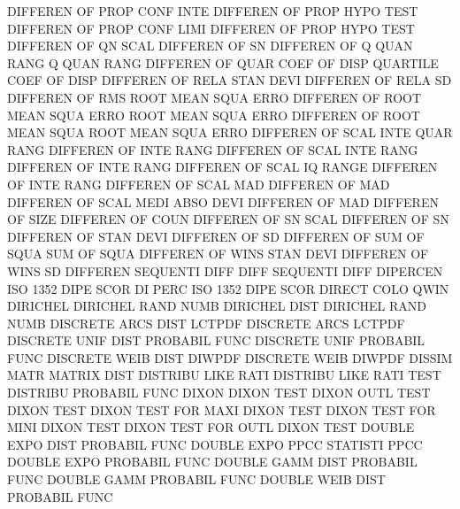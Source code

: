 DIFFEREN OF   PROP CONF INTE            DIFFEREN OF   PROP HYPO TEST
DIFFEREN OF   PROP CONF LIMI            DIFFEREN OF   PROP HYPO TEST
DIFFEREN OF   QN   SCAL                 DIFFEREN OF   SN
DIFFEREN OF   Q    QUAN RANG            Q        QUAN RANG
DIFFEREN OF   QUAR COEF OF   DISP       QUARTILE COEF OF   DISP
DIFFEREN OF   RELA STAN DEVI            DIFFEREN OF   RELA SD
DIFFEREN OF   RMS                       ROOT     MEAN SQUA ERRO
DIFFEREN OF   ROOT MEAN SQUA ERRO       ROOT     MEAN SQUA ERRO
DIFFEREN OF   ROOT MEAN SQUA            ROOT     MEAN SQUA ERRO
DIFFEREN OF   SCAL INTE QUAR RANG       DIFFEREN OF   INTE RANG
DIFFEREN OF   SCAL INTE RANG            DIFFEREN OF   INTE RANG
DIFFEREN OF   SCAL IQ   RANGE           DIFFEREN OF   INTE RANG
DIFFEREN OF   SCAL MAD                  DIFFEREN OF   MAD
DIFFEREN OF   SCAL MEDI ABSO DEVI       DIFFEREN OF   MAD
DIFFEREN OF   SIZE                      DIFFEREN OF   COUN
DIFFEREN OF   SN   SCAL                 DIFFEREN OF   SN
DIFFEREN OF   STAN DEVI                 DIFFEREN OF   SD
DIFFEREN OF   SUM  OF   SQUA            SUM      OF   SQUA
DIFFEREN OF   WINS STAN DEVI            DIFFEREN OF   WINS SD
DIFFEREN                                SEQUENTI DIFF
DIFF                                    SEQUENTI DIFF
DIPERCEN                                ISO      1352 DIPE SCOR
DI       PERC                           ISO      1352 DIPE SCOR
DIRECT   COLO                           QWIN
DIRICHEL                                DIRICHEL RAND NUMB
DIRICHEL DIST                           DIRICHEL RAND NUMB
DISCRETE ARCS DIST                      LCTPDF
DISCRETE ARCS                           LCTPDF
DISCRETE UNIF DIST                      PROBABIL FUNC
DISCRETE UNIF                           PROBABIL FUNC
DISCRETE WEIB DIST                      DIWPDF
DISCRETE WEIB                           DIWPDF
DISSIM   MATR                           MATRIX   DIST
DISTRIBU LIKE RATI                      DISTRIBU LIKE RATI TEST
DISTRIBU                                PROBABIL FUNC
DIXON                                   DIXON    TEST
DIXON    OUTL TEST                      DIXON    TEST
DIXON    TEST FOR  MAXI                 DIXON    TEST
DIXON    TEST FOR  MINI                 DIXON    TEST
DIXON    TEST FOR  OUTL                 DIXON    TEST
DOUBLE   EXPO DIST                      PROBABIL FUNC
DOUBLE   EXPO PPCC                      STATISTI PPCC
DOUBLE   EXPO                           PROBABIL FUNC
DOUBLE   GAMM DIST                      PROBABIL FUNC
DOUBLE   GAMM                           PROBABIL FUNC
DOUBLE   WEIB DIST                      PROBABIL FUNC
